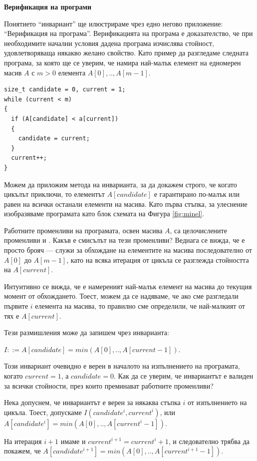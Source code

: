 {\begin{mdframed}[hidealllines=true,backgroundcolor=gray!20]
\bigskip
\textbf{Верификация на програми}
\bigskip

Понятието ``инвариант'' ще илюстрираме чрез едно негово приложение: ``Верификация на програма''. Верификацията на програма е доказателство, че при необходимите начални условия дадена програма изчислява стойност, удовлетворяваща някакво желано свойство. Като пример да разгледаме следната  програма, за която ще се уверим, че намира най-малък елемент на едномерен масив $A$ с $m>0$ елемента $A[0],..,A[m-1]$.


\begin{verbatim}
size_t candidate = 0, current = 1;
while (current < m)
{
  if (A[candidate] < a[current])
  {
    candidate = current;
  }
  current++;
}
\end{verbatim}
Можем да приложим метода на инварианта, за да докажем строго, че когато цикълът приключи, то елементът $A[candidate]$ е гарантирано по-малък или равен на всички останали елементи на масива.
Като първа стъпка, за улеснение изобразяваме програмата като блок схемата на Фигура \ref{fig:minel}.


Работните променливи на програмата, освен масива $A$, са целочислените променливи  и . Какъв е смисълът на тези променливи? Веднага се вижда, че  е просто брояч --- служи за обхождане на елементите на масива последователно от $A[0]$ до $A[m-1]$, като на всяка итерация от цикъла се разглежда стойността на $A[current]$.

Интуитивно се вижда, че  е намереният най-малък елемент на масива до текущия момент от обхождането. Тоест, можем да се надяваме, че ако сме разгледали първите $i$ елемента на масива, то правилно сме определили, че най-малкият от тях е $A[current]$.

Тези размишления може да запишем чрез инварианта:

$I ::= A[candidate]=min(A[0],..,A[current-1])$.

Този инвариант очевидно е верен в началото на изпълнението на програмата, когато $current=1$, а $candidate=0$. Как да се уверим, че инвариантът е валиден за всички стойности, през които преминават работните променливи?

Нека допуснем, че инвариантът е верен за някаква стъпка $i$ от изпълнението на цикъла. Тоест, допускаме $I(candidate^i, current^i)$, или $A[candidate^i]=min(A[0],..,A[current^i-1])$.

На итерация $i+1$ имаме  и $current^{i+1}=current^{i}+1$, и следователно трябва да покажем, че $A[candidate^{i+1}]=min(A[0],..,A[current^{i+1}-1])$.


\end{mdframed}}
